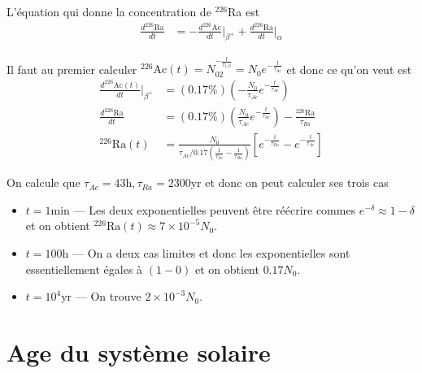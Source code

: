 \documentclass[10pt]{report}
\newcommand{\scinot}[2]{#1\times 10^{#2}}
\newcommand{\rd}[2]{\frac{d#1}{d#2}}
\begin{document}
\begin{enumerate}[1.]
        L'\'equation qui donne la concentration de $^{226}$Ra est
        \begin{align}
            \rd{^{226}\mathrm{Ra}}{t} &= -\rd{^{226}\mathrm{Ac}}{t}\Bigg|_{\beta^+} + \rd{^{226}\mathrm{Ra}}{t} \Bigg|_{\alpha}
        \end{align}

        Il faut au premier calculer $^{226}\mathrm{Ac}(t) = N_02^{-\frac{t}{\tau_{1/2}}} = N_0e^{-\frac{t}{\tau_{Ac}}}$ et donc ce qu'on veut est
        \begin{align}
            \rd{^{226}\mathrm{Ac}(t)}{t}\Bigg|_{\beta^+} &= \left( 0.17\% \right)\left( -\frac{N_0}{\tau_{Ac}}e^{-\frac{t}{\tau_{Ac}}} \right)\\
            \rd{^{226}\mathrm{Ra}}{t} &= \left( 0.17\% \right)\left( \frac{N_0}{\tau_{Ac}}e^{-\frac{t}{\tau_{Ac}}} \right) - \frac{^{226}\mathrm{Ra}}{\tau_{Ra}}\\
            ^{226}\mathrm{Ra}(t) &= \frac{N_{0}}{\tau_{Ac}/0.17\left( \frac{1}{\tau_{Ac}} - \frac{1}{\tau_{Ra}} \right)} \left[e^{-\frac{t}{\tau_{Ra}}} - e^{-\frac{t}{\tau_{Ac}}}\right]
        \end{align}

        On calcule que $\tau_{Ac} = 43\mathrm{h}, \tau_{Ra} = 2300\mathrm{yr}$ et donc on peut calculer ses trois cas
        \begin{itemize}
            \item $t = 1\mathrm{min}$ --- Les deux exponentielles peuvent \^etre r\'e\'ecrire commes $e^{-\delta} \approx 1 - \delta$ et on obtient $^{226}\mathrm{Ra}(t) \approx \scinot{7}{-5}N_0$. 
            \item $t = 100\mathrm{h}$ --- On a deux cas limites et donc les exponentielles sont essentiellement \'egales \`a $(1 - 0)$ et on obtient $0.17N_0$.
            \item $t = 10^4\mathrm{yr}$ --- On trouve $\scinot{2}{-3}N_0$. 
        \end{itemize}
\end{enumerate}

\section{Age du syst\`eme solaire}
\end{document}
